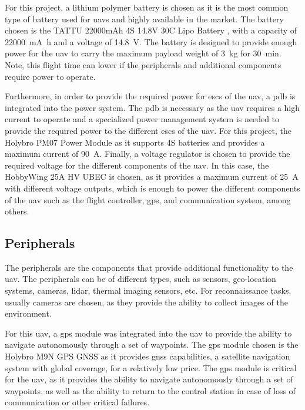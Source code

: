 For this project, a lithium polymer battery is chosen as it is the most common type of battery used for \glspl{uav} and highly available in the market. The battery chosen is the TATTU 22000mAh 4S 14.8V 30C Lipo Battery \autocite{rcinnovationsComprarBatera}, with a capacity of \SI{22000}{\milli\ampere\hour} and a voltage of \SI{14.8}{\volt}. The battery is designed to provide enough power for the \gls{uav} to carry the maximum payload weight of \SI{3}{\kilo\gram} for \SI{30}{\minute}. Note, this flight time can lower if the peripherals and additional components require power to operate.

Furthermore, in order to provide the required power for \glspl{esc} of the \gls{uav}, a \gls{pdb} is integrated into the power system. The \gls{pdb} is necessary as the \gls{uav} requires a high current to operate and a specialized power management system is needed to provide the required power to the different \glspl{esc} of the \gls{uav}. For this project, the  Holybro PM07 Power Module \autocite{rcinnovationsHolybroPM07} as it supports 4S batteries and provides a maximum current of \SI{90}{\ampere}. Finally, a voltage regulator is chosen to provide the required voltage for the different components of the \gls{uav}. In this case, the HobbyWing 25A HV UBEC \autocite{rcinnovationsHobbyWingUbec} is chosen, as it provides a maximum current of \SI{25}{\ampere} with different voltage outputs, which is enough to power the different components of the \gls{uav} such as the flight controller, \gls{gps}, and communication system, among others.

\subsection{Peripherals}

The peripherals are the components that provide additional functionality to the \gls{uav}. The peripherals can be of different types, such as sensors, geo-location systems, cameras, lidar, thermal imaging sensors, etc. For reconnaissance tasks, usually cameras are chosen, as they provide the ability to collect images of the environment.

For this \gls{uav}, a \gls{gps} module was integrated into the \gls{uav} to provide the ability to navigate autonomously through a set of waypoints. The \gls{gps} module chosen is the Holybro M9N GPS GNSS \autocite{rcinnovationsHolybroGNSS} as it provides \gls{gnss} capabilities, a satellite navigation system with global coverage, for a relatively low price. The \gls{gps} module is critical for the \gls{uav}, as it provides the ability to navigate autonomously through a set of waypoints, as well as the ability to return to the control station in case of loss of communication or other critical failures.
